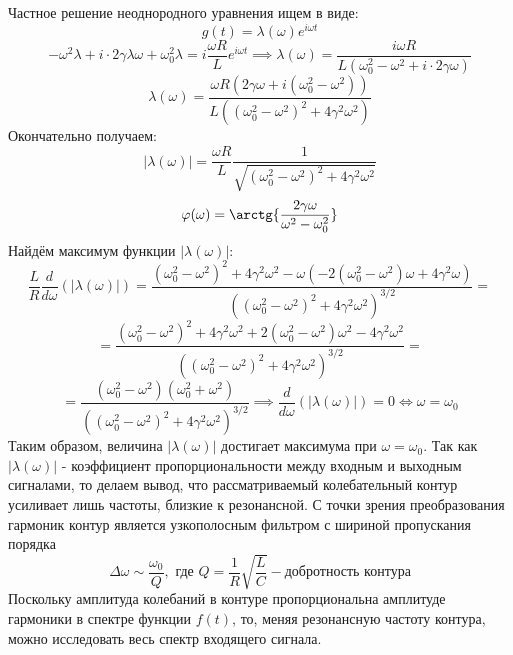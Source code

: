 \documentclass[15pt,a5paper,reqno]{article}
\begin{document}
    Частное решение неоднородного уравнения ищем в виде:
    \begin{equation*}
        g(t) = \lambda(\omega)e^{i\omega t}
    \end{equation*}
    \begin{equation*}
        -\omega^2 \lambda + i\cdot 2\gamma\lambda\omega + \omega_0^2\lambda = i\frac{\omega R}{L} e^{i \omega t} \implies \lambda(\omega) = \frac{i\omega R}{L(\omega_0^2 -\omega^2 + i\cdot 2\gamma\omega)}
    \end{equation*}
    \begin{equation*}
        \lambda(\omega) = \frac{\omega R(2\gamma\omega + i(\omega_0^2 -\omega^2))}{L((\omega_0^2 -\omega^2)^2 + 4\gamma^2\omega^2)}
    \end{equation*}
    Окончательно получаем:
    \begin{equation}
        |\lambda(\omega)| = \frac{\omega R}{L}\frac{1}{\sqrt{(\omega_0^2 -\omega^2)^2 + 4\gamma^2\omega^2}}
    \end{equation}
    \begin{equation}
        \varphi(\omega) = \arctg{\frac{2\gamma\omega}{\omega^2 - \omega_0^2}}
    \end{equation}
    Найдём максимум функции $|\lambda (\omega)|$:
    \[\frac{L}{R}\frac{d}{d\omega}(|\lambda (\omega)|) = \frac{(\omega_0^2 -\omega^2)^2 + 4\gamma^2\omega^2 - \omega(-2(\omega_0^2 - \omega^2)\omega + 4\gamma^2\omega)}{((\omega_0^2 -\omega^2)^2 + 4\gamma^2\omega^2)^{3/2}} = \]
    \[= \frac{(\omega_0^2 -\omega^2)^2 + 4\gamma^2\omega^2 + 2(\omega_0^2 - \omega^2)\omega^2 - 4\gamma^2\omega^2}{((\omega_0^2 -\omega^2)^2 + 4\gamma^2\omega^2)^{3/2}} =\]
    \[= \frac{(\omega_0^2 -\omega^2)(\omega_0^2 + \omega^2)}{((\omega_0^2 -\omega^2)^2 + 4\gamma^2\omega^2)^{3/2}} \implies \frac{d}{d\omega}(|\lambda (\omega)|) = 0 \iff \omega = \omega_0\]
    Таким образом, величина $|\lambda(\omega)|$ достигает максимума при $\omega = \omega_0$. Так как $|\lambda(\omega)|$ - коэффициент пропорциональности между входным и выходным сигналами, то делаем вывод, что рассматриваемый колебательный контур усиливает лишь частоты, близкие к резонансной. С точки зрения преобразования гармоник контур является узкополосным фильтром с шириной пропускания порядка
    \begin{equation*}
        \Delta\omega \sim \frac{\omega_0}{Q},\text{ где } Q = \frac{1}{R}\sqrt{\frac{L}{C}} - \text{добротность контура}
    \end{equation*}
    Поскольку амплитуда колебаний в контуре пропорциональна амплитуде гармоники в спектре функции $f(t)$, то, меняя резонансную частоту контура, можно исследовать весь спектр входящего сигнала.
\end{document}
